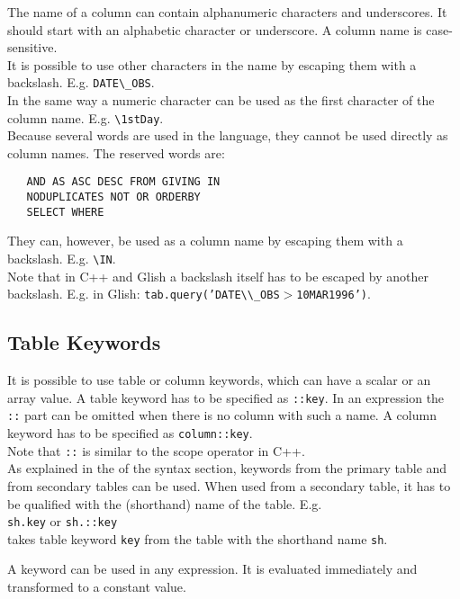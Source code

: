 The name of a column can contain alphanumeric characters and underscores.
It should start with an alphabetic character or underscore.
A column name is case-sensitive.
\\It is possible to use other characters in the name by
escaping them with a backslash. E.g. \texttt{DATE}\verb+\_+\texttt{OBS}.
\\In the same way a numeric character can be used as the first
character of the column name. E.g. \verb+\+\texttt{1stDay}.
\\
Because several words are used in the language, they cannot
be used directly as column names. The reserved words are:
\begin{verbatim}
   AND AS ASC DESC FROM GIVING IN
   NODUPLICATES NOT OR ORDERBY
   SELECT WHERE
\end{verbatim}
They can, however, be used as a column name by escaping
them with a backslash. E.g. \verb+\+\texttt{IN}.
\\Note that in C++ and Glish a backslash itself has to be escaped
by another backslash. E.g. in Glish:
\texttt{tab.query('DATE}\verb+\\_+\texttt{OBS$>$10MAR1996')}.

\subsection{\label{TAQL:KEYWORDS}Table Keywords}
It is possible to use table or column keywords, which can have
a scalar or an array value. A table keyword has to be specified
as \texttt{::key}. In an expression the \texttt{::} part can be omitted
when there is no column with such a name.
A column keyword has to be specified as \texttt{column::key}.
\\Note that \texttt{::} is similar to the scope operator in C++.
\\
As explained in the  of the syntax
section, keywords from the primary table and from secondary tables
can be used. When used from a secondary table, it has to be qualified
with the (shorthand) name of the table. E.g.
\\\texttt{sh.key} or \texttt{sh.::key}
\\takes table keyword \texttt{key} from the table with the shorthand name
\texttt{sh}.

A keyword can be used in any expression. It is evaluated immediately
and transformed to a constant value.

